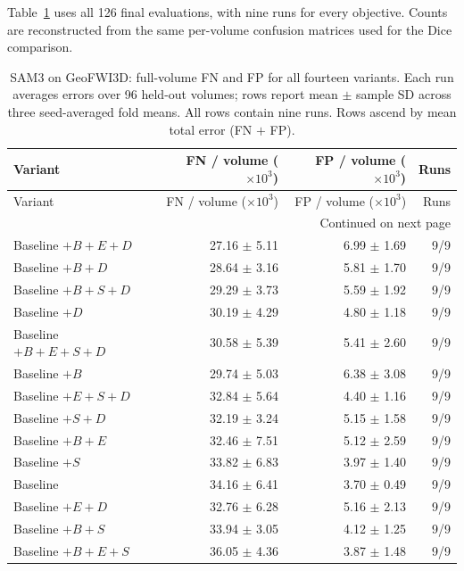 \documentclass[12pt,a4paper]{article}
\begin{document}
Table~\ref{tab:sam3-geo-errors} uses all 126 final evaluations,
with nine runs for every objective. Counts are reconstructed from the
same per-volume confusion matrices used for the Dice comparison.

\begingroup\footnotesize{}
\setlength{\tabcolsep}{4pt}
\renewcommand{\arraystretch}{1.12}
\begin{longtable}{@{}lrrr@{}}
\caption{SAM3 on GeoFWI3D: full-volume FN and FP for all fourteen variants. Each run averages errors over 96 held-out volumes; rows report mean $\pm$ sample SD across three seed-averaged fold means. All rows contain nine runs. Rows ascend by mean total error (FN $+$ FP).}
\label{tab:sam3-geo-errors}\\
\hline
Variant & \shortstack{FN / volume\\($\times 10^{3}$)} & \shortstack{FP / volume\\($\times 10^{3}$)} & Runs \\ \hline
\endfirsthead
\hline
Variant & \shortstack{FN / volume\\($\times 10^{3}$)} & \shortstack{FP / volume\\($\times 10^{3}$)} & Runs \\ \hline
\endhead
\hline
\multicolumn{4}{r}{Continued on next page}\\
\endfoot
\hline\endlastfoot
Baseline $+B+E+D$ & 27.16 $\pm$ 5.11 & 6.99 $\pm$ 1.69 & 9/9 \\
Baseline $+B+D$ & 28.64 $\pm$ 3.16 & 5.81 $\pm$ 1.70 & 9/9 \\
Baseline $+B+S+D$ & 29.29 $\pm$ 3.73 & 5.59 $\pm$ 1.92 & 9/9 \\
Baseline $+D$ & 30.19 $\pm$ 4.29 & 4.80 $\pm$ 1.18 & 9/9 \\
Baseline $+B+E+S+D$ & 30.58 $\pm$ 5.39 & 5.41 $\pm$ 2.60 & 9/9 \\
Baseline $+B$ & 29.74 $\pm$ 5.03 & 6.38 $\pm$ 3.08 & 9/9 \\
Baseline $+E+S+D$ & 32.84 $\pm$ 5.64 & 4.40 $\pm$ 1.16 & 9/9 \\
Baseline $+S+D$ & 32.19 $\pm$ 3.24 & 5.15 $\pm$ 1.58 & 9/9 \\
Baseline $+B+E$ & 32.46 $\pm$ 7.51 & 5.12 $\pm$ 2.59 & 9/9 \\
Baseline $+S$ & 33.82 $\pm$ 6.83 & 3.97 $\pm$ 1.40 & 9/9 \\
Baseline & 34.16 $\pm$ 6.41 & 3.70 $\pm$ 0.49 & 9/9 \\
Baseline $+E+D$ & 32.76 $\pm$ 6.28 & 5.16 $\pm$ 2.13 & 9/9 \\
Baseline $+B+S$ & 33.94 $\pm$ 3.05 & 4.12 $\pm$ 1.25 & 9/9 \\
Baseline $+B+E+S$ & 36.05 $\pm$ 4.36 & 3.87 $\pm$ 1.48 & 9/9 \\
\end{longtable}
\endgroup
\end{document}

